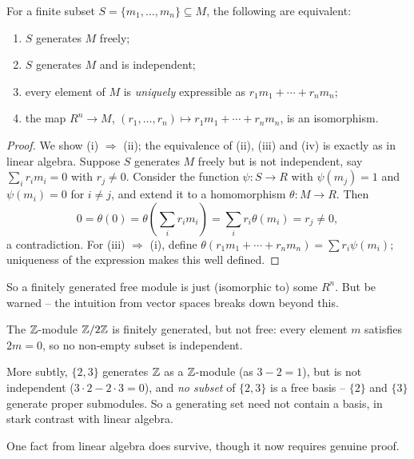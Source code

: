 \documentclass[a4paper]{scrartcl}
\begin{document}
\begin{proposition}
	For a finite subset $S = \{m_1, \dots, m_n\} \subseteq M$, the following are equivalent:
	\begin{enumerate}[label=(\roman*)]
		\item $S$ generates $M$ freely;
		\item $S$ generates $M$ and is independent;
		\item every element of $M$ is \emph{uniquely} expressible as $r_1 m_1 + \cdots + r_n m_n$;
		\item the map $R^n \rightarrow M$, $(r_1, \dots, r_n) \mapsto r_1 m_1 + \cdots + r_n m_n$, is an isomorphism.
	\end{enumerate}
\end{proposition}
\begin{proof}
	We show (i) $\Rightarrow$ (ii); the equivalence of (ii), (iii) and (iv) is exactly as in linear algebra. Suppose $S$ generates $M$ freely but is not independent, say $\sum_i r_i m_i = 0$ with $r_j \neq 0$. Consider the function $\psi: S \rightarrow R$ with $\psi(m_j) = 1$ and $\psi(m_i) = 0$ for $i \neq j$, and extend it to a homomorphism $\theta: M \rightarrow R$. Then
	$$
	0 = \theta(0) = \theta\left(\sum_i r_i m_i\right) = \sum_i r_i \theta(m_i) = r_j \neq 0,
	$$
	a contradiction. For (iii) $\Rightarrow$ (i), define $\theta(r_1m_1 + \cdots + r_nm_n) = \sum r_i \psi(m_i)$; uniqueness of the expression makes this well defined.
\end{proof}

So a finitely generated free module is just (isomorphic to) some $R^n$. But be warned -- the intuition from vector spaces breaks down beyond this.

\begin{example}
	The $\mathbb{Z}$-module $\mathbb{Z}/2\mathbb{Z}$ is finitely generated, but not free: every element $m$ satisfies $2m = 0$, so no non-empty subset is independent.

	More subtly, $\{2, 3\}$ generates $\mathbb{Z}$ as a $\mathbb{Z}$-module (as $3 - 2 = 1$), but is not independent ($3 \cdot 2 - 2 \cdot 3 = 0$), and \emph{no subset} of $\{2, 3\}$ is a free basis -- $\{2\}$ and $\{3\}$ generate proper submodules. So a generating set need not contain a basis, in stark contrast with linear algebra.
\end{example}

One fact from linear algebra does survive, though it now requires genuine proof.
\end{document}
